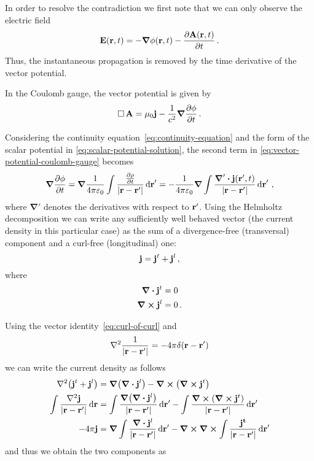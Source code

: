 \documentclass[12pt, class=report, crop=false]{standalone}
\begin{document}
In order to resolve the contradiction we first note that we can only observe
the electric field
\[
  \vb{E}(\vb{r}, t) = -\grad{\phi}(\vb{r},t) -\pdv{\vb{A}(\vb{r},t)}{t}\,.
\]
Thus, the instantaneous propagation is removed by the time derivative
of the vector potential.

In the Coulomb gauge, the vector potential is given by
\begin{equation}
  \label{eq:vector-potential-coulomb-gauge}
  \operatorname{\Box} \vb{A} = \mu_0 \vb{j} - \frac{1}{c^2} \grad{\pdv{\phi}{t}}\,.
\end{equation}

Considering the continuity equation~\eqref{eq:continuity-equation} and
the form of the scalar potential in \cref{eq:scalar-potential-solution},
the second term in \cref{eq:vector-potential-coulomb-gauge} becomes
\begin{equation}
  \label{eq:scalar-potential-continuity-equation}
  \grad{\pdv{\phi}{t}} = \grad \frac{1}{4\pi \varepsilon_0}
    \int \frac{\pdv{\rho}{t}}{|\vb{r}-\vb{r}'|} \dd{\vb{r}}'
    = - \frac{1}{4\pi \varepsilon_0} \grad
    \int \frac{\boldsymbol{\nabla}' \vdot \vb{j}(\vb{r}',t)}{|\vb{r}-\vb{r}'|} \dd{\vb{r}}'\,,
\end{equation}
where \(\boldsymbol{\nabla}'\) denotes the derivatives with respect to \(\vb{r}'\).
Using the Helmholtz decomposition we can write any sufficiently well behaved
vector (the current density in this particular case) as the sum
of a divergence-free (transversal) component and a curl-free (longitudinal) one:
\[
  \vb{j} = \vb{j}^t + \vb{j}^l \,,
\]
where
\begin{align*}
  \div{\vb{j}^t} &= 0 \\
  \curl{\vb{j}^l} &= 0 \,.
\end{align*}

Using the vector identity~\eqref{eq:curl-of-curl} and
\[
  \laplacian{\frac{1}{|\vb{r}-\vb{r}'|}} = -4\pi \delta(\vb{r}-\vb{r}')
\]
we can write the current density as follows
\begin{align*}
  \laplacian(\vb{j}^t + \vb{j}^l) &= \grad(\div{\vb{j}^l}) - \curl(\curl{\vb{j}^t}) \\
  \int \frac{\laplacian{\vb{j}}}{|\vb{r}-\vb{r}'|} \dd{\vb{r}} &=
    \int \frac{\grad(\div{\vb{j}^l})}{|\vb{r}-\vb{r}'|} \dd{\vb{r}'}
    - \int \frac{\curl(\curl{\vb{j}^t})}{|\vb{r}-\vb{r}'|} \dd{\vb{r}'} \\
  -4\pi \vb{j} &= \grad \int \frac{\div{\vb{j}^l}}{|\vb{r}-\vb{r}'|} \dd{\vb{r}'}
    - \curl \curl \int \frac{\vb{j^t}}{|\vb{r}-\vb{r}'|} \dd{\vb{r}'}
\end{align*}
and thus we obtain the two components as
\end{document}
